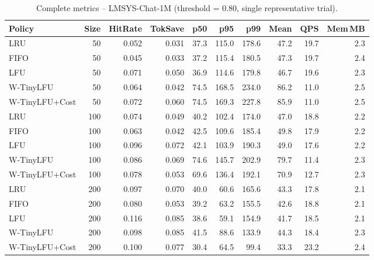 \documentclass[11pt,a4paper]{article}
\begin{document}
\begin{table}[H]
\centering
\caption{Complete metrics -- LMSYS-Chat-1M (threshold = 0.80, single representative trial).}
\label{tab:full_lmsys080}
\scriptsize
\setlength{\tabcolsep}{3pt}
\begin{tabular}{@{} l r rrrr rr rr @{}}
\toprule
\textbf{Policy} & \textbf{Size} & \textbf{HitRate} & \textbf{TokSave} & \textbf{p50} & \textbf{p95} & \textbf{p99} & \textbf{Mean} & \textbf{QPS} & \textbf{Mem\,MB} \\
\midrule
LRU              & 50  & 0.052 & 0.031 & 37.3 & 115.0 & 178.6 & 47.2 & 19.7 & 2.3 \\
FIFO             & 50  & 0.045 & 0.033 & 37.2 & 115.4 & 180.5 & 47.3 & 19.7 & 2.4 \\
LFU              & 50  & 0.071 & 0.050 & 36.9 & 114.6 & 179.8 & 46.7 & 19.6 & 2.3 \\
W-TinyLFU        & 50  & 0.064 & 0.042 & 74.5 & 168.5 & 234.0 & 86.2 & 11.0 & 2.5 \\
W-TinyLFU+Cost   & 50  & 0.072 & 0.060 & 74.5 & 169.3 & 227.8 & 85.9 & 11.0 & 2.5 \\
\midrule
LRU              & 100 & 0.074 & 0.049 & 40.2 & 102.4 & 174.0 & 47.0 & 18.8 & 2.2 \\
FIFO             & 100 & 0.063 & 0.042 & 42.5 & 109.6 & 185.4 & 49.8 & 17.9 & 2.2 \\
LFU              & 100 & 0.096 & 0.072 & 42.1 & 103.9 & 190.3 & 49.0 & 17.6 & 2.2 \\
W-TinyLFU        & 100 & 0.086 & 0.069 & 74.6 & 145.7 & 202.9 & 79.7 & 11.4 & 2.3 \\
W-TinyLFU+Cost   & 100 & 0.078 & 0.053 & 69.6 & 136.4 & 192.1 & 70.9 & 12.7 & 2.3 \\
\midrule
LRU              & 200 & 0.097 & 0.070 & 40.0 & 60.6  & 165.6 & 43.3 & 17.8 & 2.1 \\
FIFO             & 200 & 0.080 & 0.053 & 39.2 & 63.2  & 155.5 & 42.6 & 18.8 & 2.1 \\
LFU              & 200 & 0.116 & 0.085 & 38.6 & 59.1  & 154.9 & 41.7 & 18.5 & 2.1 \\
W-TinyLFU        & 200 & 0.098 & 0.085 & 41.5 & 88.6  & 133.9 & 44.3 & 18.4 & 2.3 \\
W-TinyLFU+Cost   & 200 & 0.100 & 0.077 & 30.4 & 64.5  & 99.4  & 33.3 & 23.2 & 2.4 \\
\bottomrule
\end{tabular}
\end{table}
\end{document}
